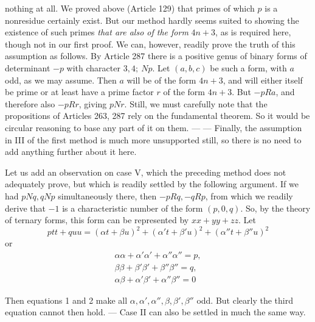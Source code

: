 nothing at all. We proved above (Article 129) that primes of which
\(p\) is a nonresidue certainly exist. But our method hardly seems
suited to showing the existence of such primes \textit{that are
also of the form} \(4n+3\), as is required here, though not in our
first proof. We can, however, readily prove the truth of this
assumption as follows. By Article 287 there is a positive genus
of binary forms of determinant \(-p\) with character \(3,4;\ Np\).
Let \((a,b,c)\) be such a form, with \(a\) odd, as we may assume.
Then \(a\) will be of the form \(4n+3\), and will either itself
be prime or at least have a prime factor \(r\) of the form \(4n+3\).
But \(-pRa\), and therefore also \(-pRr\), giving \(pNr\). Still,
we must carefully note that the propositions of Articles 263, 287
rely on the fundamental theorem. So it would be circular reasoning
to base any part of it on them. — — Finally, the assumption in
III of the first method is much more unsupported still, so there
is no need to add anything further about it here.

Let us add an observation on case V, which the preceding method
does not adequately prove, but which is readily settled by the
following argument. If we had \(pNq,qNp\) simultaneously there, then
\(-pRq,-qRp\), from which we readily derive that \(-1\) is a characteristic
number of the form \((p,0,q)\). So, by the theory of ternary forms,
this form can be represented by \(xx+yy+zz\). Let
\[ptt+quu=(\alpha t+\beta u)^2+(\alpha't+\beta'u)^2+(\alpha''t+\beta''u)^2\]
or
\[\begin{gathered}\alpha\alpha+\alpha'\alpha'+\alpha''\alpha''=p,\\\beta\beta+\beta'\beta'+\beta''\beta''=q,\\\alpha\beta+\alpha'\beta'+\alpha''\beta''=0\end{gathered}\]

Then equations 1 and 2 make all \(\alpha,\alpha',\alpha'',\beta,\beta',\beta''\) odd. But clearly the third
equation cannot then hold. — Case II can also be settled in much
the same way.
